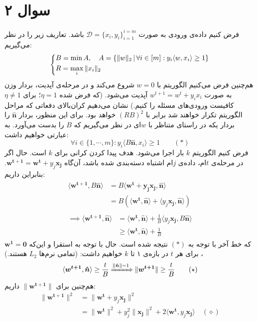 \documentclass[a4paper, 12pt]{article}
\begin{document}
\section*{سوال ۲}
فرض کنیم داده‌ی ورودی به صورت
$\mathcal{D} = \{x_i, y_i\}_{i=1}^{i=m}$
باشد. تعاریف زیر را در نظر می‌گیریم:
\[
\begin{dcases}
	B = \min A, \quad A = \{\|w\|_2 \,|\, \forall i \in [m]: y_i \langle w, x_i \rangle \ge 1\} \\
	R = \max_i \|x_i\|_2
\end{dcases}
\]
هم‌چنین فرض می‌کنیم الگوریتم با $w=0$ شروع می‌کند و در مرحله‌ی آپدیت، بردار وزن به صورت
$w^{t+1} = w^{t} + y_ix_i$
آپدیت می‌شود. (که فرض شده $\eta = 1$؛ برای $\eta \ne 1$ کافیست ورودی‌های مسئله را   کنیم.) نشان می‌دهیم کران‌بالای دفعاتی که مراحل الگوریتم تکرار خواهند شد برابر با
$(RB)^2$
خواهد بود. برای این منظور، بردار $\bm{\hat{n}}$ را بردار یکه در راستای متناظر با $w$ای در نظر می‌گیریم که $B$ را بدست می‌آورد. به عبارتی خواهیم داشت:
\[
\forall i \in \{1, \cdots, m\}: y_i\langle B\bm{\hat{n}}, x_i\rangle \ge 1 \qquad (\ast)
\]
فرض کنیم الگوریتم $k$ بار اجرا می‌شود. هدف پیدا کردن کرانی برای $k$ است. حال اگر در مرحله‌ی $t$ام، داده‌ی $j$ام اشتباه دسته‌بندی شده باشد، آن‌گاه
$\bm{w^{t+1}} = \bm{w^{t}} + y_j\bm{x_j}$.
بنابراین داریم:
\[
\begin{aligned}
	\begin{aligned}
		\langle\bm{w^{t+1}}, B\bm{\hat{n}}\rangle &= B \langle\bm{w^t + y_j\bm{x_j}}, \bm{\hat{n}}\rangle \\
		&= B \left(\langle\bm{w^t}, \bm{\hat{n}}\rangle + \langle y_j\bm{x_j}, \bm{\hat{n}}\rangle\right)
	\end{aligned} \\[1.5em]
	\begin{aligned}
		\implies\langle\bm{w^{t+1}}, \bm{\hat{n}} \rangle &= \langle\bm{w^t}, \bm{\hat{n}}\rangle + \frac{1}{B} \langle y_j\bm{x_j}, B\bm{\hat{n}}\rangle \\
		&\ge \langle\bm{w^t}, \bm{\hat{n}}\rangle + \frac{1}{B}
	\end{aligned}
\end{aligned}
\]
که خط آخر با توجه به $(\ast)$ نتیجه شده است. حال با توجه به استقرا و این‌که 
$\bm{w^1} = \bm{0}$
، برای هر $t$ در بازه‌ی ۱ تا $k$ خواهیم داشت: (تمامی نرم‌ها $L_2$ هستند.)
\[
\langle\bm{w^{t+1}}, \bm{\hat{n}}\rangle \ge \frac{t}{B} \xRightarrow{\|\bm{\hat{n}}\| = 1} \|\bm{w^{t+1}}\| \ge \frac{t}{B} \qquad (\star)
\]
هم‌چنین برای
$\|\bm{w^{t+1}}\|$
داریم:
\[
\begin{aligned}
	\|\bm{w^{t+1}}\|^2 &= \|\bm{w^t} + y_j\bm{x_j}\|^2 \\
	&= \|\bm{w^t}\|^2 + y_j^2\|\bm{x_j}\|^2 + 2\langle\bm{w^t}, y_j\bm{x_j}\rangle \quad (\diamond)
\end{aligned}
\]
\end{document}
